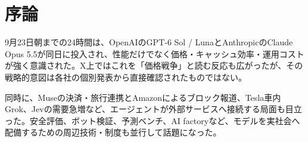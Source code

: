 \section*{序論}
9月23日朝までの24時間は、OpenAIのGPT-6 Sol / LunaとAnthropicのClaude Opus 5.5が同日に投入され、性能だけでなく価格・キャッシュ効率・運用コストが強く意識された。X上ではこれを「価格戦争」と読む反応も広がったが、その戦略的意図は各社の個別発表から直接確認されたものではない。

同時に、Museの決済・旅行連携とAmazonによるブロック報道、Tesla車内Grok、Jevの需要急増など、エージェントが外部サービスへ接続する局面も目立った。安全評価、ボット検証、予測ベンチ、AI factoryなど、モデルを実社会へ配備するための周辺技術・制度も並行して話題になった。
